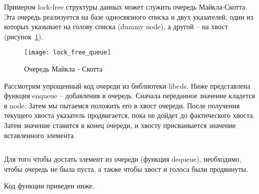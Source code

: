 Примером lock-free структуры данных может служить очередь Майкла-Скотта.
Эта очередь реализуется на базе односвязного списка и двух указателей, один из которых указывает на голову списка (dummy node), а другой -- на хвост (рисунок~\ref{lockFreeQueue:image}).

\begin{figure}[H]
    \centering
    \texttt{[image: lock\_free\_queue]}
    \caption{Очередь Майкла - Скотта}
    \label{lockFreeQueue:image}
\end{figure}
	
Рассмотрим упрощенный код очереди из библиотеки libcds.
Ниже представлена функция enqueue -- добавления в очередь.
Сначала переданное значение кладется в node.
Затем мы пытаемся положить его в хвост очереди.
После получения текущего хвоста указатель продвигается, пока не дойдет до фактического хвоста.
Затем значение ставится в конец очереди, и хвосту присваивается значение вставленного элемента.

\inputminted{c++}{listings/lockFreeQueueEnqueue.cpp}
	
Для того чтобы достать элемент из очереди (функция dequeue), необходимо, чтобы очередь не была пуста, а также чтобы хвост и голоса были продвинуты.

Код функции приведен ниже.
\inputminted{c++}{listings/lockFreeQueueDequeue.cpp}

